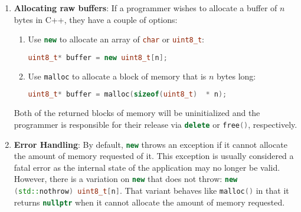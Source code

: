 \documentclass[letterpaper, 12pt]{article}
\newcommand{\inlinecode}[1]{\colorbox{codegrey}{\lstinline[language=C++]{#1}}}
\begin{document}
\begin{enumerate}
  \item {\bfseries Allocating raw buffers}:
  If a programmer wishes to allocate a buffer of $n$ bytes in C++, they have a couple of options:
  \begin{enumerate}
   \item Use \inlinecode{new} to allocate an array of \inlinecode{char} or \inlinecode{uint8_t}:
   \begin{lstlisting}[language=C++]
   uint8_t* buffer = new uint8_t[n];
   \end{lstlisting}
   \item Use \inlinecode{malloc} to allocate a block of memory that is $n$ bytes long:
   \begin{lstlisting}[language=C++]
   uint8_t* buffer = malloc(sizeof(uint8_t)  * n);
   \end{lstlisting}
  \end{enumerate}
  Both of the returned blocks of memory will be uninitialized and the programmer is responsible
  for their release via \inlinecode{delete} or \inlinecode{free()}, respectively.
  
  \item {\bfseries Error Handling}:
  By default, \inlinecode{new} throws an exception if it cannot allocate the amount of memory
  requested of it. This exception is usually considered a fatal error as the internal state of
  the application may no longer be valid. However, there is a variation on \inlinecode{new} that
  does not throw: \inlinecode{new (std::nothrow) uint8_t[n]}. That variant behaves like \inlinecode{malloc()}
  in that it returns \inlinecode{nullptr} when it cannot allocate the amount of memory requested.


\end{enumerate}
\end{document}
